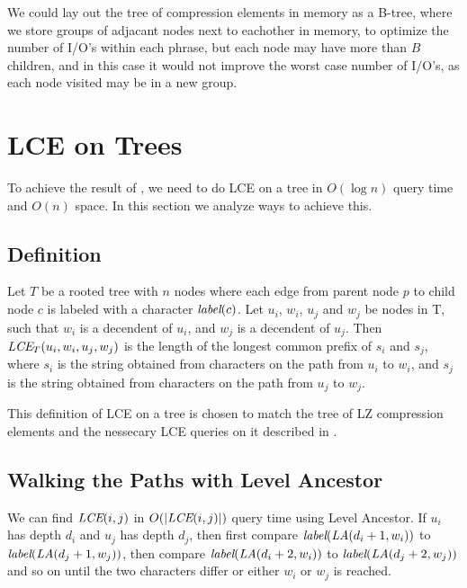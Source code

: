 \documentclass[a4]{article}
\newcommand*{\pref}{\prettyref}
\begin{document}
We could lay out the tree of compression elements in memory as a B-tree, where we store groups of adjacant nodes next to eachother in memory, to optimize the number of I/O's within each phrase, but each node may have more than $B$ children, and in this case it would not improve the worst case number of I/O's, as each node visited may be in a new group.

\section{LCE on Trees\label{sec:tree-lce}}

To achieve the result of \pref{thm:lz-tree}, we need to do LCE on a tree in $O(\log n)$ query time and $O(n)$ space. In this section we analyze ways to achieve this.

\subsection{Definition\label{sec:tree-def}}

Let $T$ be a rooted tree with $n$ nodes where each edge from parent node $p$ to child node $c$ is labeled with a character $\textit{label}(c)$. Let $u_i$, $w_i$, $u_j$ and $w_j$ be nodes in T, such that $w_i$ is a decendent of $u_i$, and $w_j$ is a decendent of $u_j$. Then $\textit{LCE}_T(u_i, w_i, u_j, w_j)$ is the length of the longest common prefix of $s_i$ and $s_j$, where $s_i$ is the string obtained from characters on the path from $u_i$ to $w_i$, and $s_j$ is the string obtained from characters on the path from $u_j$ to $w_j$.

This definition of LCE on a tree is chosen to match the tree of LZ compression elements and the nessecary LCE queries on it described in \pref{sec:lz-other}.

\subsection{Walking the Paths with Level Ancestor}

We can find $\textit{LCE}(i,j)$ in $O(|\textit{LCE}(i,j)|)$ query time using Level Ancestor. If $u_i$ has depth $d_i$ and $u_j$ has depth $d_j$, then first compare $\textit{label}(\textit{LA}(d_i+1,w_i))$ to $\textit{label}(\textit{LA}(d_j+1,w_j))$, then compare $\textit{label}(\textit{LA}(d_i+2,w_i))$ to $\textit{label}(\textit{LA}(d_j+2,w_j))$ and so on until the two characters differ or either $w_i$ or $w_j$ is reached.
\end{document}
